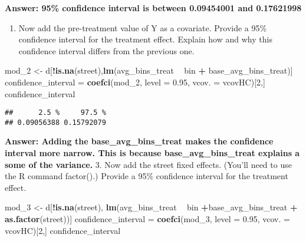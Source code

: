 \documentclass[
]{article}
\newenvironment{Shaded}{\begin{snugshade}}{\end{snugshade}}
\newcommand{\DataTypeTok}[1]{\textcolor[rgb]{0.13,0.29,0.53}{#1}}
\newcommand{\DecValTok}[1]{\textcolor[rgb]{0.00,0.00,0.81}{#1}}
\newcommand{\FloatTok}[1]{\textcolor[rgb]{0.00,0.00,0.81}{#1}}
\newcommand{\KeywordTok}[1]{\textcolor[rgb]{0.13,0.29,0.53}{\textbf{#1}}}
\newcommand{\NormalTok}[1]{#1}
\newcommand{\OperatorTok}[1]{\textcolor[rgb]{0.81,0.36,0.00}{\textbf{#1}}}
\newcommand{\StringTok}[1]{\textcolor[rgb]{0.31,0.60,0.02}{#1}}
\providecommand{\tightlist}{%
  \setlength{\itemsep}{0pt}\setlength{\parskip}{0pt}}
\begin{document}
\textbf{Answer: 95\% confidence interval is between 0.09454001 and
0.17621998}

\begin{enumerate}
\def\labelenumi{\arabic{enumi}.}
\setcounter{enumi}{1}
\tightlist
\item
  Now add the pre-treatment value of Y as a covariate. Provide a 95\%
  confidence interval for the treatment effect. Explain how and why this
  confidence interval differs from the previous one.
\end{enumerate}

\begin{Shaded}
\begin{Highlighting}[]
\NormalTok{mod_}\DecValTok{2}\NormalTok{ <-}\StringTok{ }\NormalTok{d[}\OperatorTok{!}\KeywordTok{is.na}\NormalTok{(street),}\KeywordTok{lm}\NormalTok{(avg_bins_treat }\OperatorTok{~}\StringTok{ }\NormalTok{bin }\OperatorTok{+}\StringTok{ }\NormalTok{base_avg_bins_treat)]}
\NormalTok{confidence_interval =}\StringTok{ }\KeywordTok{coefci}\NormalTok{(mod_}\DecValTok{2}\NormalTok{, }\DataTypeTok{level =} \FloatTok{0.95}\NormalTok{, }\DataTypeTok{vcov. =}\NormalTok{ vcovHC)[}\DecValTok{2}\NormalTok{,] }
\NormalTok{confidence_interval}
\end{Highlighting}
\end{Shaded}

\begin{verbatim}
##      2.5 %     97.5 % 
## 0.09056388 0.15792079
\end{verbatim}

\textbf{Answer: Adding the base\_avg\_bins\_treat makes the confidence
interval more narrow. This is because base\_avg\_bins\_treat explains a
some of the variance.} 3. Now add the street fixed effects. (You'll need
to use the R command factor().) Provide a 95\% confidence interval for
the treatment effect.

\begin{Shaded}
\begin{Highlighting}[]
\NormalTok{mod_}\DecValTok{3}\NormalTok{ <-}\StringTok{ }\NormalTok{d[}\OperatorTok{!}\KeywordTok{is.na}\NormalTok{(street), }\KeywordTok{lm}\NormalTok{(avg_bins_treat }\OperatorTok{~}\StringTok{ }\NormalTok{bin }\OperatorTok{+}\NormalTok{base_avg_bins_treat }\OperatorTok{+}\StringTok{ }\KeywordTok{as.factor}\NormalTok{(street))]}
\NormalTok{confidence_interval =}\StringTok{ }\KeywordTok{coefci}\NormalTok{(mod_}\DecValTok{3}\NormalTok{, }\DataTypeTok{level =} \FloatTok{0.95}\NormalTok{, }\DataTypeTok{vcov. =}\NormalTok{ vcovHC)[}\DecValTok{2}\NormalTok{,] }
\NormalTok{confidence_interval}
\end{Highlighting}
\end{Shaded}
\end{document}
